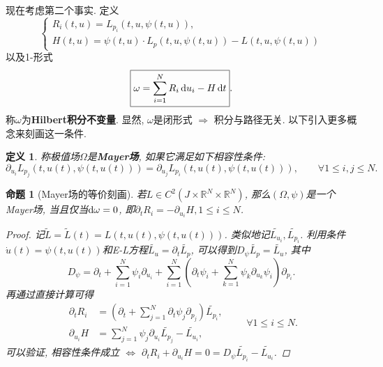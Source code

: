 \documentclass[12pt,a4paper]{article}
\newtheorem{definition}[theorem]{定义}
\newtheorem{proposition}[theorem]{命题}
\begin{document}
现在考虑第二个事实. 定义 
\begin{equation*}
    \begin{cases} 
        R_i(t, u) = L_{p_i}(t, u, \psi(t, u)), \\  
        H(t, u) = \psi(t, u) \cdot L_p(t, u, \psi(t, u)) - L(t, u, \psi(t, u)) 
    \end{cases}
\end{equation*}
以及1-形式 
\begin{equation*}
    \boxed{\omega = \sum\limits_{i = 1}^NR_i \,{\rm d}u_i - H \,{\rm d}t}.
\end{equation*}
称$\omega$为\textbf{Hilbert积分不变量}. 显然, $\omega$是闭形式 $\Rightarrow$ 积分与路径无关.
以下引入更多概念来刻画这一条件.

\begin{definition}
    称极值场$\Omega$是\textbf{Mayer场}, 如果它满足如下相容性条件:
    \begin{equation*}
        \boxed{\partial_{u_i}L_{p_j}(t, u(t), \psi(t, u(t))) = \partial_{u_j}L_{p_i}(t, u(t), \psi(t, u(t))), \qquad \forall 1 \leq i, j \leq N.} 
    \end{equation*}
\end{definition}

\begin{proposition}[Mayer场的等价刻画]
    若$L \in C^2(J \times \mathbb{R}^N \times \mathbb{R}^N)$, 那么$(\Omega, \psi)$是一个Mayer场, 当且仅当${\rm d}\omega = 0$, 即$\partial_tR_i = -\partial_{u_i}H,1 \leq i \leq N$.
    \begin{proof}
        记$\widetilde{L} = \widetilde{L}(t) = L(t, u(t), \psi(t, u(t)))$. 类似地记$\widetilde{L_{u_i}}, \widetilde{L_{p_i}}$.
        利用条件$\dot u(t) = \psi(t, u(t))$和E-L方程$\widetilde{L_u} = \partial_t\widetilde{L_p}$, 可以得到$D_{\psi}\widetilde{L_p} = \widetilde{L_u}$, 其中 
        \begin{equation*}
            D_{\psi} = \partial_t + \sum\limits_{i = 1}^N\psi_i\partial_{u_i} + \sum\limits_{i = 1}^N\left(\partial_t\psi_i + \sum\limits_{k = 1}^N\psi_k\partial_{u_k}\psi_i\right)\partial_{p_i}. 
        \end{equation*}
        再通过直接计算可得
        \begin{equation*} 
            \begin{aligned} 
                \partial_tR_i &= \left(\partial_t + \sum_{j = 1}^N\partial_t\psi_j\partial_{p_j}\right)\widetilde{L_{p_i}}, \\ 
                \partial_{u_i}H &= \sum_{j = 1}^N\psi_j\partial_{u_i}\widetilde{L_{p_j}} - \widetilde{L_{u_i}}, 
            \end{aligned}  
            \qquad \forall 1 \leq i \leq N. 
        \end{equation*}
        可以验证, 相容性条件成立 $\Leftrightarrow$ $\partial_tR_i + \partial_{u_i}H = 0 =  D_{\psi}\widetilde{L_{p_i}} - \widetilde{L_{u_i}}$.
    \end{proof}
\end{proposition}
\end{document}
